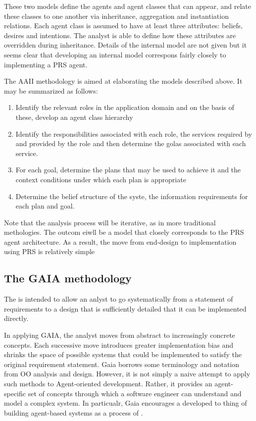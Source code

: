 These two models define the agents and agent classes that can appear, and relate these classes to one another via inheritance, aggregation and instantiation relations.
Each agent class is assumed to have at least three attributes: beliefs, desires and intentions. The analyst is able to define how these attributes are overridden during inheritance.
Details of the internal model are not given but it seems clear that developing an internal model correspons fairly closely to implementing a PRS agent.

The AAII methodology is aimed at elaborating the models described above. It may be summarized as follows:
\begin{enumerate}
\item Identify the relevant roles in the application domain and on the basis of these, develop an agent class hierarchy
\item Identify the responsibilities associated with each role, the services required by and provided by the role and then determine the golas associated with each service.
\item For each goal, determine the plans that may be used to achieve it and the context conditions under which each plan is appropriate
\item Determine the belief structure of the syste, the information requirements for each plan and goal.
\end{enumerate}
Note that the analysis process will be iterative, as in more traditional methologies. The outcom eiwll be a model that closely corresponds to the PRS agent architecture. As a result, the move from end-design to implementation using PRS is relatively simple
\subsection{The GAIA methodology}
The  is intended to allow an anlyst to go systematically from a statement of requirements to a design that is sufficiently detailed that it can be implemented directly.

In applying GAIA, the analyst moves from abstract to increasingly concrete concepts. Each successive move introduces greater implementation bias and shrinks the space of possible systems that  could be implemented to satisfy the original requirement statement.
Gaia borrows some terminology and notation from OO analysis and design. However, it is not simply a naive attempt to apply such methods to Agent-oriented development. Rather, it provides an agent-specific set of concepts through which a software engineer can understand and model a complex system. In particualr, Gaia encourages a developed to thing of building agent-based systems as a process of .

